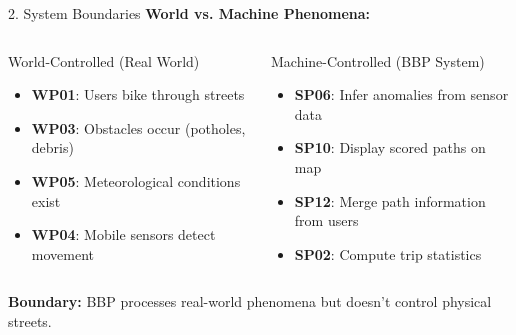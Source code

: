 \documentclass[aspectratio=169, 10pt]{beamer}
\begin{document}
\begin{frame}{2. System Boundaries}
    \textbf{World vs. Machine Phenomena:}
    
    \vspace{0.3cm}
    \begin{columns}[T]
        \begin{block}{World-Controlled (Real World)}
            \begin{itemize}
                \item \textbf{WP01}: Users bike through streets
                \item \textbf{WP03}: Obstacles occur (potholes, debris)
                \item \textbf{WP05}: Meteorological conditions exist
                \item \textbf{WP04}: Mobile sensors detect movement
            \end{itemize}
        \end{block}
        
        \begin{block}{Machine-Controlled (BBP System)}
            \begin{itemize}
                \item \textbf{SP06}: Infer anomalies from sensor data
                \item \textbf{SP10}: Display scored paths on map
                \item \textbf{SP12}: Merge path information from users
                \item \textbf{SP02}: Compute trip statistics
            \end{itemize}
        \end{block}
    \end{columns}
    
    \vspace{0.2cm}
    \textbf{Boundary:} BBP processes real-world phenomena but doesn't control physical streets.
\end{frame}
\end{document}
